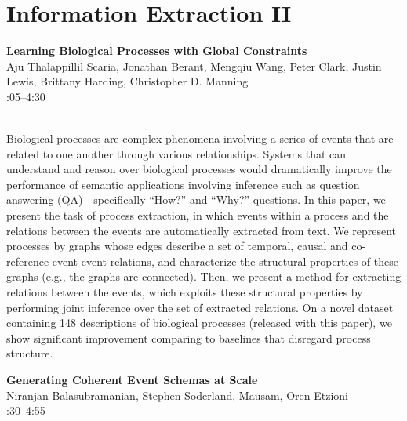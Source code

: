 \documentclass[twoside,makeidx]{book}
\renewcommand{\normalsize}{\fontsize{8}{9}\selectfont}
\renewcommand{\small}{\fontsize{7}{8}\selectfont}
\begin{document}
\section{Information Extraction II}
\vspace{-1em}
\par\vspace{2em}\noindent%
\begin{minipage}{\linewidth}%
\begin{center}
\textbf{\normalsize Learning Biological Processes with Global Constraints}\\
\normalsize  Aju Thalappillil Scaria,  Jonathan Berant,  Mengqiu Wang,  Peter Clark,  Justin Lewis,  Brittany Harding,  Christopher D. Manning\\
{\small 4:05--4:30}\\
\end{center}
\end{minipage}\\[0.5em]
\nopagebreak%
\noindent%
{\small Biological processes are complex phenomena involving a series of events that are related to one another through various relationships. Systems that can understand and reason over biological processes would dramatically improve the performance of semantic applications involving inference such as question answering (QA) - specifically ``How?'' and ``Why?'' questions. In this paper, we present the task of process extraction, in which events within a process and the relations between the events are automatically extracted from text. We represent processes by graphs whose edges describe a set of temporal, causal and co-reference event-event relations, and characterize the structural properties of these graphs (e.g., the graphs are connected). Then, we present a method for extracting relations between the events, which exploits these structural properties by performing joint inference over the set of extracted relations. On a novel dataset containing 148 descriptions of biological processes (released with this paper), we show significant improvement comparing to baselines that disregard process structure.}
\par\vspace{2em}\noindent%
\begin{minipage}{\linewidth}%
\begin{center}
\textbf{\normalsize Generating Coherent Event Schemas at Scale}\\
\normalsize  Niranjan Balasubramanian,  Stephen Soderland,  Mausam,  Oren Etzioni\\
{\small 4:30--4:55}\\
\end{center}
\end{minipage}\\[0.5em]
\end{document}
